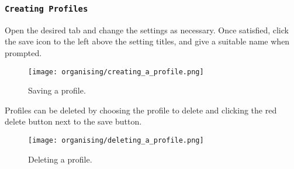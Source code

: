\subsubsection{\texttt{Creating Profiles}} %
\label{sub:creating_profiles}

Open the desired tab and change the settings as necessary.  Once satisfied, click the save icon to the left above the setting titles, and give a suitable name when prompted.

\begin{figure}[H]
\centering
\texttt{[image: organising/creating\_a\_profile.png]}
\caption{Saving a profile.}
\label{fig:creating_a_profile}
\end{figure}

Profiles can be deleted by choosing the profile to delete and clicking the red delete button next to the save button.

\begin{figure}[H]
\centering
\texttt{[image: organising/deleting\_a\_profile.png]}
\caption{Deleting a profile.}
\label{fig:deleting_a_profile}
\end{figure}



